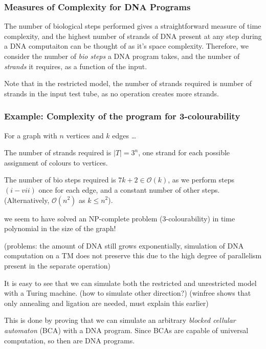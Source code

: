 \documentclass{beamer}
\begin{document}
\begin{frame}
\frametitle{Measures of Complexity for DNA Programs}

The number of biological steps performed gives a straightforward measure of time complexity, and the highest number of strands of DNA present at any step during a DNA computaiton can be thought of as it's space complexity. Therefore, we consider the number of \emph{bio steps} a DNA program takes, and the number of \emph{strands} it requires, as a function of the input.

Note that in the restricted model, the number of strands required is number of strands in the input test tube, as no operation creates more strands.
\end{frame}

\begin{frame}
\frametitle{Example: Complexity of the program for 3-colourability}

For a graph with $n$ vertices and $k$ edges \ldots

The number of strands required is $\lvert T \rvert = 3^n$, one strand for each possible assignment of colours to vertices.

The number of bio steps required is $7k + 2 \in \mathcal{O}(k)$, as we perform steps $(i - vii)$ once for each edge, and a constant number of other steps. (Alternatively, $\mathcal{O}(n^2)$ as $k \leq n^2$).
\end{frame}


\begin{frame}

we seem to have solved an NP-complete problem (3-colourability) in time polynomial in the size of the graph!

(problems: the amount of DNA still grows exponentially, simulation of DNA computation on a TM does not preserve this due to the high degree of parallelism present in the separate operation)

\end{frame}


\begin{frame}
It is easy to see that we can simulate both the restricted and unrestricted model with a Turing machine. (how to simulate other direction?) (winfree shows that only annealing and ligation are needed, must explain this earlier)

This is done by proving that we can simulate an arbitrary \emph{blocked cellular automaton} (BCA) with a DNA program. Since BCAs are capable of universal computation, so then are DNA programs.

\end{frame}
\end{document}
